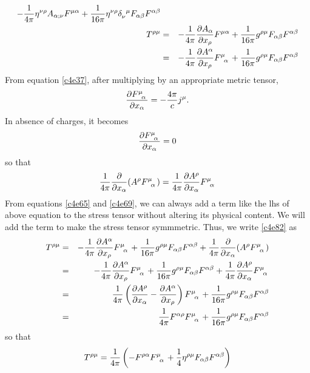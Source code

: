 \begin{enumerate}
\begin{eqnarray}
	-\frac{1}{4\pi}\eta^{\nu\rho}A_{\alpha;\nu} F^{\mu\alpha} +
	\frac{1}{16\pi}\eta^{\nu\rho}\tensor{\delta}{_\nu^\mu} F_{\alpha\beta}
	F^{\alpha\beta} \nonumber \\
T^{\rho\mu} &=& -\frac{1}{4\pi}\pdt{A_\alpha}{x_\rho}F^{\mu\alpha} + 
\frac{1}{16\pi}\tensor{g}{^\rho^\mu} F_{\alpha\beta}F^{\alpha\beta} \nonumber \\
 &=& -\frac{1}{4\pi}\pdt{A^\alpha}{x_\rho}\tensor{F}{^\mu_\alpha} + 
\frac{1}{16\pi}\tensor{g}{^\rho^\mu} F_{\alpha\beta}F^{\alpha\beta} 
\label{c4e82}
\end{eqnarray}
From equation \eqref{c4e37}, after multiplying by an appropriate metric tensor,
\[
\pdt{\tensor{F}{^\mu_\alpha}}{x_\alpha} = -\frac{4\pi}{c}j^\mu.
\]
In absence of charges, it becomes
\[
\pdt{\tensor{F}{^\mu_\alpha}}{x_\alpha} = 0
\]
so that
\begin{equation}\label{c4e83}
\frac{1}{4\pi}\frac{\partial}{\partial x_\alpha}(A^\rho\tensor{F}{^\mu_\alpha}) 
= \frac{1}{4\pi}\pdt{A^\rho}{x_\alpha}\tensor{F}{^\mu_\alpha}
\end{equation}
From equations \eqref{c4e65} and \eqref{c4e69}, we can always add a term like 
the lhs of above equation to the stress tensor without altering its physical 
content. We will add the term to make the stress tensor symmmetric. Thus, we 
write \eqref{c4e82} as
\begin{eqnarray*}
T^{\rho\mu} &=& -\frac{1}{4\pi}\pdt{A^\alpha}{x_\rho}\tensor{F}{^\mu_\alpha} + 
\frac{1}{16\pi}\tensor{g}{^\rho^\mu} F_{\alpha\beta}F^{\alpha\beta} +
\frac{1}{4\pi}\frac{\partial}{\partial x_\alpha}(A^\rho
\tensor{F}{^\mu_\alpha}) \\
 &=& -\frac{1}{4\pi}\pdt{A^\alpha}{x_\rho}\tensor{F}{^\mu_\alpha} + 
\frac{1}{16\pi}\tensor{g}{^\rho^\mu} F_{\alpha\beta}F^{\alpha\beta} +
\frac{1}{4\pi}\pdt{A^\rho}{x_\alpha}\tensor{F}{^\mu_\alpha} \\
 &=& \frac{1}{4\pi}\left(\pdt{A^\rho}{x_\alpha} - \pdt{A^\alpha}{x_\rho}\right)
 \tensor{F}{^\mu_\alpha} + 
 \frac{1}{16\pi}\tensor{g}{^\rho^\mu} F_{\alpha\beta}F^{\alpha\beta} \\
 &=& \frac{1}{4\pi}F^{\alpha\rho}\tensor{F}{^\mu_\alpha} +
  \frac{1}{16\pi}\tensor{g}{^\rho^\mu} F_{\alpha\beta}F^{\alpha\beta}
\end{eqnarray*}
so that
\begin{equation}\label{c4e84}
T^{\rho\mu} = \frac{1}{4\pi}\left(-F^{\rho\alpha}\tensor{F}{^\mu_\alpha} +
\frac{1}{4}\eta^{\rho\mu}F_{\alpha\beta}F^{\alpha\beta}\right)
\end{equation}

\end{enumerate}
